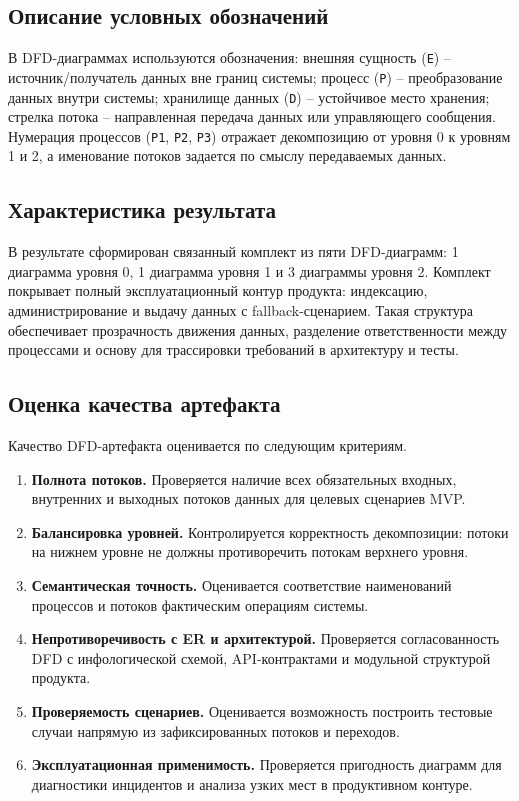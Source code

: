 ﻿\documentclass[14pt,a4paper]{extarticle}
\begin{document}
\subsection{Описание условных обозначений}
\noindent В DFD-диаграммах используются обозначения: внешняя сущность (\texttt{E}) -- источник/получатель данных вне границ системы; процесс (\texttt{P}) -- преобразование данных внутри системы; хранилище данных (\texttt{D}) -- устойчивое место хранения; стрелка потока -- направленная передача данных или управляющего сообщения. Нумерация процессов (\texttt{P1}, \texttt{P2}, \texttt{P3}) отражает декомпозицию от уровня 0 к уровням 1 и 2, а именование потоков задается по смыслу передаваемых данных.

\subsection{Характеристика результата}
\noindent В результате сформирован связанный комплект из пяти DFD-диаграмм: 1 диаграмма уровня 0, 1 диаграмма уровня 1 и 3 диаграммы уровня 2. Комплект покрывает полный эксплуатационный контур продукта: индексацию, администрирование и выдачу данных с fallback-сценарием. Такая структура обеспечивает прозрачность движения данных, разделение ответственности между процессами и основу для трассировки требований в архитектуру и тесты.

\subsection{Оценка качества артефакта}
\noindent Качество DFD-артефакта оценивается по следующим критериям.
\begin{enumerate}
  \item \textbf{Полнота потоков.} Проверяется наличие всех обязательных входных, внутренних и выходных потоков данных для целевых сценариев MVP.
  \item \textbf{Балансировка уровней.} Контролируется корректность декомпозиции: потоки на нижнем уровне не должны противоречить потокам верхнего уровня.
  \item \textbf{Семантическая точность.} Оценивается соответствие наименований процессов и потоков фактическим операциям системы.
  \item \textbf{Непротиворечивость с ER и архитектурой.} Проверяется согласованность DFD с инфологической схемой, API-контрактами и модульной структурой продукта.
  \item \textbf{Проверяемость сценариев.} Оценивается возможность построить тестовые случаи напрямую из зафиксированных потоков и переходов.
  \item \textbf{Эксплуатационная применимость.} Проверяется пригодность диаграмм для диагностики инцидентов и анализа узких мест в продуктивном контуре.
\end{enumerate}
\end{document}
